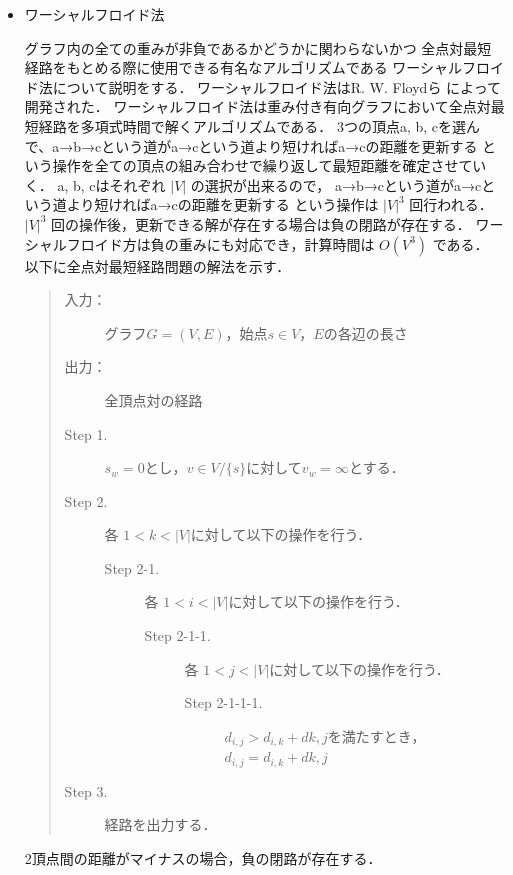\documentclass[12pt]{optlab-bachelor}
\begin{document}
\begin{itemize}
  \item ワーシャルフロイド法

  グラフ内の全ての重みが非負であるかどうかに関わらないかつ
  全点対最短経路をもとめる際に使用できる有名なアルゴリズムである
  ワーシャルフロイド法について説明をする．
  ワーシャルフロイド法はR. W. Floydら \cite{Floyd}によって開発された．
  ワーシャルフロイド法は重み付き有向グラフにおいて全点対最短経路を多項式時間で解くアルゴリズムである．
  3つの頂点a, b, cを選んで、a→b→cという道がa→cという道より短ければa→cの距離を更新する
  という操作を全ての頂点の組み合わせで繰り返して最短距離を確定させていく．
  a, b, cはそれぞれ $|V|$ の選択が出来るので，
  a→b→cという道がa→cという道より短ければa→cの距離を更新する
  という操作は $|V|^3$ 回行われる．
  $|V|^3$ 回の操作後，更新できる解が存在する場合は負の閉路が存在する．
  ワーシャルフロイド方は負の重みにも対応でき，計算時間は $O(V^3)$ である．
  以下に全点対最短経路問題の解法を示す．

  \begin{quote}
    \begin{description}
      \item[入力：] グラフ$G=(V,E)$，始点$s \in V$，$E$の各辺の長さ
      \item[出力：] 全頂点対の経路
      \item[Step 1.] $s_w = 0$とし，$v \in V/\{s\}$に対して$v_w = \infty$とする．
      \item[Step 2.] 各 $1<k<|V|$に対して以下の操作を行う．
      \begin{description}
        \item[Step 2-1.] 各 $1<i<|V|$に対して以下の操作を行う．
        \begin{description}
          \item[Step 2-1-1.] 各 $1<j<|V|$に対して以下の操作を行う．
          \begin{description}
            \item[Step 2-1-1-1.] $d_{i,j} > d_{i,k} + d{k,j}$を満たすとき，
            $d_{i,j} = d_{i,k} + d{k,j}$
          \end{description}
        \end{description}
      \end{description}

      \item[Step 3.] 経路を出力する．
    \end{description}
  \end{quote}
  2頂点間の距離がマイナスの場合，負の閉路が存在する．
\end{itemize}
\end{document}
